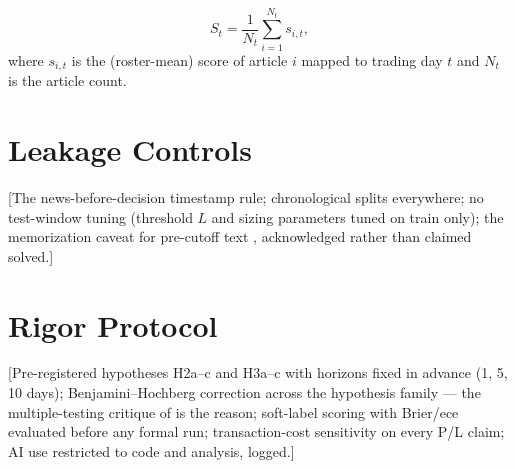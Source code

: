 \begin{equation}
  S_t = \frac{1}{N_t} \sum_{i=1}^{N_t} s_{i,t},
  \label{eq:daily-sentiment}
\end{equation}
where $s_{i,t}$ is the (roster-mean) score of article $i$ mapped to
trading day $t$ and $N_t$ is the article count.

\section{Leakage Controls}
\label{sec:data-leakage}

[The news-before-decision timestamp rule; chronological splits
everywhere; no test-window tuning (threshold $L$ and sizing parameters
tuned on train only); the memorization caveat for pre-cutoff text
\parencite{glasserman2023lookahead}, acknowledged rather than claimed
solved.]

\section{Rigor Protocol}
\label{sec:data-rigor}

[Pre-registered hypotheses H2a--c and H3a--c with horizons fixed in
advance (1, 5, 10 days); Benjamini--Hochberg correction across the
hypothesis family \parencite{benjamini1995fdr} --- the
multiple-testing critique of \textcite{harvey2016multiple} is the
reason; soft-label scoring with Brier/\gls{ece} evaluated before any
formal run; transaction-cost sensitivity on every P/L claim; AI use
restricted to code and analysis, logged.]
